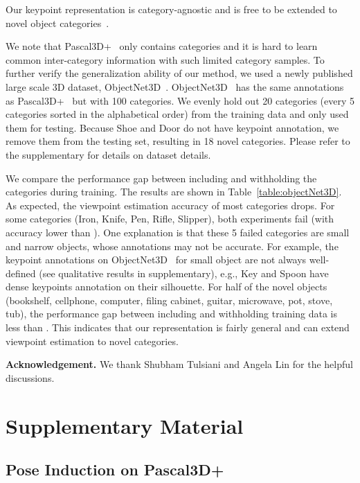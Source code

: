 \documentclass[runningheads]{llncs}
\begin{document}
Our keypoint representation is category-agnostic and is free to be extended to novel object categories~\cite{tulsiani2015pose}.

We note that Pascal3D+~\cite{xiang2014beyond} only contains  categories and it is hard to learn common inter-category information with such limited category samples. 
To further verify the generalization ability of our method, we used a newly published large scale 3D dataset, ObjectNet3D~\cite{xiang2016objectnet3d}.
ObjectNet3D~\cite{xiang2016objectnet3d} has the same annotations as Pascal3D+~\cite{xiang2014beyond} but with 100 categories.
We evenly hold out 20 categories (every 5 categories sorted in the alphabetical order) from the training data and only used them for testing. Because Shoe and Door do not have keypoint annotation, we remove them from the testing set, resulting in 18 novel categories. Please refer to the supplementary for details on dataset details.


We compare the performance gap between including and withholding the  categories during training. 
The results are shown in Table~\ref{table:objectNet3D}. 
As expected, the viewpoint estimation accuracy of most categories drops.
For some categories (Iron, Knife, Pen, Rifle, Slipper), both experiments fail (with accuracy lower than ). One explanation is that these 5 failed categories are small and narrow objects, whose annotations may not be accurate. For example, the keypoint annotations on ObjectNet3D~\cite{xiang2016objectnet3d} for small object are not always well-defined (see qualitative results in supplementary),
e.g., Key and Spoon have dense keypoints annotation on their silhouette.
For half of the  novel objects (bookshelf, cellphone, computer, filing cabinet, guitar, microwave, pot, stove, tub), the performance gap between including and withholding training data is less than .
This indicates that our representation is fairly general and can extend viewpoint estimation to novel categories.

 \noindent\textbf{Acknowledgement.} We thank Shubham Tulsiani and Angela Lin for the helpful discussions.  



\clearpage
\section{Supplementary Material}

\subsection{Pose Induction on Pascal3D+}
\end{document}
